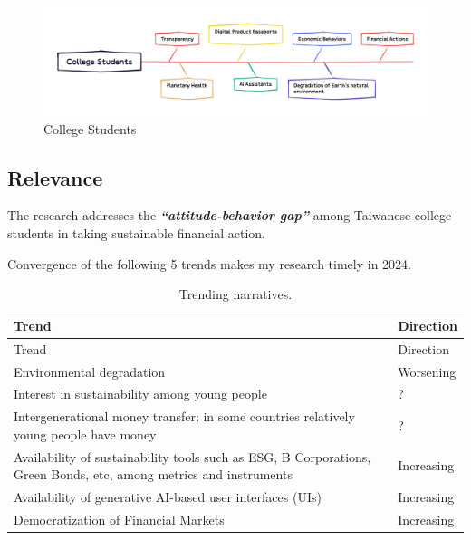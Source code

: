 \documentclass[
  letterpaper,
  DIV=11,
  numbers=noendperiod]{scrartcl}
\begin{document}
\begin{figure}[H]

{\centering \includegraphics[width=1\linewidth,height=\textheight,keepaspectratio]{./images/introduction/abstract.png}

}

\caption{College Students}

\end{figure}%

\subsection{Relevance}\label{relevance}

The research addresses the \textbf{\emph{``attitude-behavior gap''}}
among Taiwanese college students in taking sustainable financial action.

Convergence of the following 5 trends makes my research timely in 2024.

\begin{longtable}[]{@{}
  >{\raggedright\arraybackslash}p{}
  >{\raggedright\arraybackslash}p{}@{}}
\caption{Trending narratives.}\tabularnewline
\toprule\noalign{}
\begin{minipage}[b]{\linewidth}\raggedright
Trend
\end{minipage} & \begin{minipage}[b]{\linewidth}\raggedright
Direction
\end{minipage} \\
\midrule\noalign{}
\endfirsthead
\toprule\noalign{}
\begin{minipage}[b]{\linewidth}\raggedright
Trend
\end{minipage} & \begin{minipage}[b]{\linewidth}\raggedright
Direction
\end{minipage} \\
\midrule\noalign{}
\endhead
\bottomrule\noalign{}
\endlastfoot
Environmental degradation & Worsening \\
Interest in sustainability among young people & ? \\
Intergenerational money transfer; in some countries relatively young
people have money & ? \\
Availability of sustainability tools such as ESG, B Corporations, Green
Bonds, etc, among metrics and instruments & Increasing \\
Availability of generative AI-based user interfaces (UIs) &
Increasing \\
Democratization of Financial Markets & Increasing \\
\end{longtable}
\end{document}

